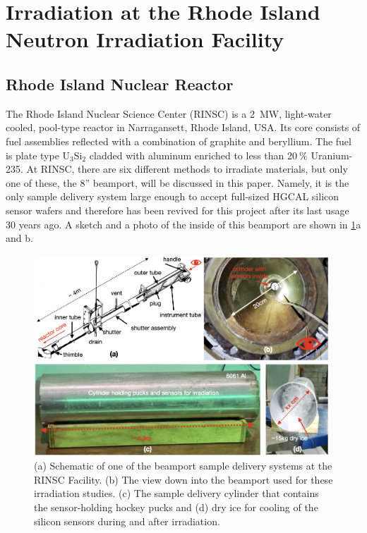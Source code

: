 \section{Irradiation at the Rhode Island Neutron Irradiation Facility}
\label{sec:irradiation}

\subsection{Rhode Island Nuclear Reactor}
\label{subsec:RINSC}
The Rhode Island Nuclear Science Center (RINSC) is a \SI{2}{\mega\watt}, light-water cooled, pool-type reactor in Narragansett, Rhode Island, USA.
Its core consists of fuel assemblies reflected with a combination of graphite and beryllium.
The fuel is plate type U$_3$Si$_2$ cladded with aluminum enriched to less than 20$~\%$ Uranium-235.
At RINSC, there are six different methods to irradiate materials, but only one of these, the 8'' beamport, will be discussed in this paper.
Namely, it is the only sample delivery system large enough to accept full-sized HGCAL silicon sensor wafers and therefore has been revived for this project after its last usage 30 years ago.\newline
A sketch and a photo of the inside of this beamport are shown in \ref{fig:Beamport_Schematic}a and b.
\begin{figure}[!hbt]
  \begin{center}
    \includegraphics[width=0.99\textwidth]{figures/figures_edited_001.jpeg}
    \caption{(a) Schematic of one of the beamport sample delivery systems at the RINSC Facility.
    (b) The view down into the beamport used for these irradiation studies.
    (c) The sample delivery cylinder that contains the sensor-holding hockey pucks and (d) dry ice for cooling of the silicon sensors during and after irradiation.
    }
    \label{fig:Beamport_Schematic}
  \end{center}
\end{figure}
